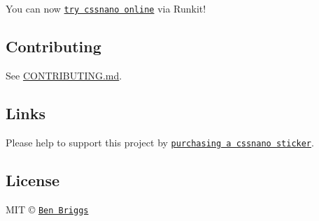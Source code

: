 You can now \href{https://runkit.com/npm/cssnano}{\tt try cssnano online} via Runkit!

\subsection*{Contributing}

See \mbox{\hyperlink{readable-stream_2_c_o_n_t_r_i_b_u_t_i_n_g_8md}{C\+O\+N\+T\+R\+I\+B\+U\+T\+I\+NG.md}}.

\subsection*{Links}

Please help to support this project by \href{https://www.stickermule.com/uk/marketplace/11086-cssnano}{\tt purchasing a cssnano sticker}.

\subsection*{License}

M\+IT © \href{http://beneb.info}{\tt Ben Briggs} 